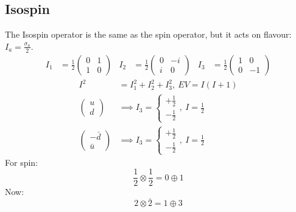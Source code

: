 \documentclass[a4paper, 11pt, normalem]{report}
\begin{document}
\subsection{Isospin}
The Isospin operator is the same as the spin operator, but it acts on flavour: $I_a = \frac{\sigma_a}{2}$.
\begin{align}
    I_1 &= \frac12 \begin{pmatrix} 0 & 1 \\ 1 & 0 \end{pmatrix} & I_2 &= \frac12\begin{pmatrix} 0 & -i \\ i & 0 \end{pmatrix} & I_3 &= \frac12 \begin{pmatrix} 1 & 0 \\ 0 & -1\end{pmatrix} 
\end{align}
\begin{align}
    I^2 &= I_1^2 + I_2^2 + I_3^2,~ EV = I(I+1) \\
    \begin{pmatrix} u \\ d\end{pmatrix} &\implies I_3 = \begin{cases} +\frac12 \\ -\frac12\end{cases},~ I = \frac12 \\
    \begin{pmatrix} -\bar{d} \\ \bar{u}\end{pmatrix} &\implies I_3 = \begin{cases} +\frac12 \\ -\frac12 \end{cases},~ I = \frac12
\end{align}
For spin: 
\begin{equation}
    \frac12 \otimes \frac 12 = 0 \oplus 1
\end{equation}
Now: 
\begin{equation}
    2\otimes \bar{2} = 1 \oplus 3
\end{equation}
\begin{figure}[H]
    \centering
\end{figure}
\end{document}
